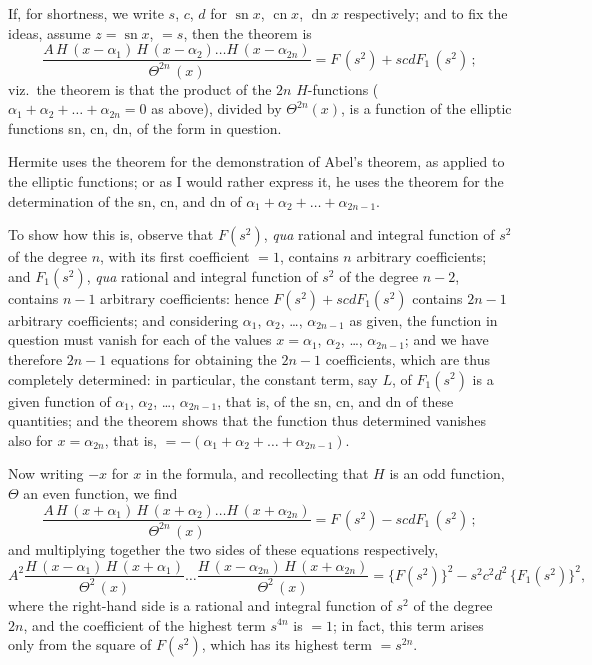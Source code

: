 \documentclass[11pt,a4paper]{book}
\begin{document}
If, for shortness, we write $s$, $c$, $d$ for $\operatorname{sn} x$, $\operatorname{cn} x$, $\operatorname{dn} x$ respectively; and to fix the ideas, assume $z = \operatorname{sn} x$, $=s$, then the theorem is
\[ \frac{A\,H\,(x-\alpha_1)\, H\,(x-\alpha_2) \ldots H\,(x-\alpha_{2n})}{\Theta^{2n}\,(x)} = F\,(s^2) + scdF_1\,(s^2)\,; \]
viz.\ the theorem is that the product of the $2n$ $H$-functions ($\alpha_1 + \alpha_2 + \ldots + \alpha_{2n} = 0$ as above), divided by $\Theta^{2n}(x)$, is a function of the elliptic functions sn, cn, dn, of the form in question.

Hermite uses the theorem for the demonstration of Abel's theorem, as applied to the elliptic functions; or as I would rather express it, he uses the theorem for the determination of the sn, cn, and dn of $\alpha_1 + \alpha_2 + \ldots + \alpha_{2n-1}$.

To show how this is, observe that $F(s^2)$, \textit{qua} rational and integral function of $s^2$ of the degree $n$, with its first coefficient $=1$, contains $n$ arbitrary coefficients; and $F_1(s^2)$, \textit{qua} rational and integral function of $s^2$ of the degree $n-2$, contains $n-1$ arbitrary coefficients: hence $F(s^2) + scdF_1(s^2)$ contains $2n-1$ arbitrary coefficients; and considering $\alpha_1$, $\alpha_2$, \ldots, $\alpha_{2n-1}$ as given, the function in question must vanish for each of the values $x = \alpha_1$, $\alpha_2$, \ldots, $\alpha_{2n-1}$; and we have therefore $2n-1$ equations for obtaining the $2n-1$ coefficients, which are thus completely determined: in particular, the constant term, say $L$, of $F_1(s^2)$ is a given function of $\alpha_1$, $\alpha_2$, \ldots, $\alpha_{2n-1}$, that is, of the sn, cn, and dn of these quantities; and the theorem shows that the function thus determined vanishes also for $x = \alpha_{2n}$, that is, $=-(\alpha_1 + \alpha_2 + \ldots + \alpha_{2n-1})$.

Now writing $-x$ for $x$ in the formula, and recollecting that $H$ is an odd function, $\Theta$ an even function, we find
\[ \frac{A\,H\,(x+\alpha_1)\, H\,(x+\alpha_2) \ldots H\,(x+\alpha_{2n})}{\Theta^{2n}\,(x)} = F\,(s^2) - scdF_1\,(s^2)\,; \]
and multiplying together the two sides of these equations respectively,
\[ A^2 \frac{H\,(x-\alpha_1)\, H\,(x+\alpha_1)}{\Theta^2\,(x)} \ldots \frac{H\,(x-\alpha_{2n})\, H\,(x+\alpha_{2n})}{\Theta^2\,(x)} = \{F(s^2)\}^2 - s^2 c^2 d^2\, \{F_1(s^2)\}^2, \]
where the right-hand side is a rational and integral function of $s^2$ of the degree $2n$, and the coefficient of the highest term $s^{4n}$ is $=1$; in fact, this term arises only from the square of $F(s^2)$, which has its highest term $= s^{2n}$.
\end{document}
